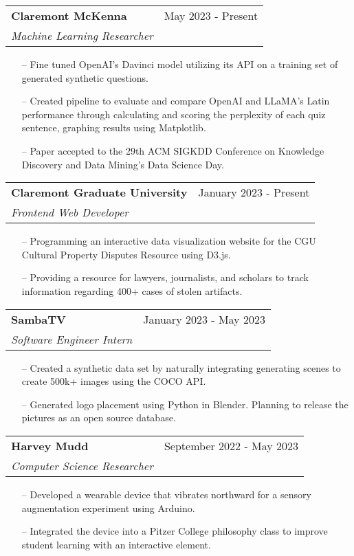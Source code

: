\documentclass[letterpaper,10pt]{article}
\makeatletter
\newcommand{\resumeSubheading}[4]{
  \vspace{-2pt}\item
    \begin{tabular*}{0.97\textwidth}[t]{l@{\extracolsep{\fill}}r}
      \textbf{#1} & #2 \\
      \textit{\small#3} & \textit{\small #4} \\
    \end{tabular*}\vspace{-7pt}
}
\makeatother
\begin{document}
      \resumeSubheading
      {Claremont McKenna}{May 2023 - Present}
      {Machine Learning Researcher}{}
      \begin{itemize}\small
      \setlength\itemsep{0em}
          \item[--] Fine tuned OpenAI's Davinci model utilizing its API on a training set of generated synthetic questions.
          \item[--] Created pipeline to evaluate and compare OpenAI and LLaMA's Latin performance through calculating and scoring the perplexity of each quiz sentence, graphing results using Matplotlib.
          \item[--] Paper accepted to the 29th ACM SIGKDD Conference on Knowledge Discovery and Data Mining’s Data Science Day.
      \end{itemize}
    \resumeSubheading
      {Claremont Graduate University}{January 2023 - Present}
      {Frontend Web Developer}{}
      \begin{itemize}\small
      \setlength\itemsep{0em}
        \item[--] Programming an interactive data visualization website for the CGU Cultural Property Disputes Resource using D3.js.
        \item[--] Providing a resource for lawyers, journalists, and scholars to track information regarding 400+ cases of stolen artifacts.

      \end{itemize}
    \resumeSubheading
      {SambaTV}{January 2023 - May 2023}
      {Software Engineer Intern}{}
      \begin{itemize}\small
      \setlength\itemsep{0em}
        \item[--] Created a synthetic data set by naturally integrating generating scenes to create 500k+ images using the COCO API.
        \item[--] Generated logo placement using Python in Blender. Planning to release the pictures as an open source database.

      \end{itemize}
    \resumeSubheading
      {Harvey Mudd}{September 2022 - May 2023}
      {Computer Science Researcher}{}
      \begin{itemize}\small
      \setlength\itemsep{0em}
        \item[--] Developed a wearable device that vibrates northward for a sensory augmentation experiment using Arduino.
        \item[--] Integrated the device into a Pitzer College philosophy class to improve student learning with an interactive element.

      \end{itemize}
\end{document}
